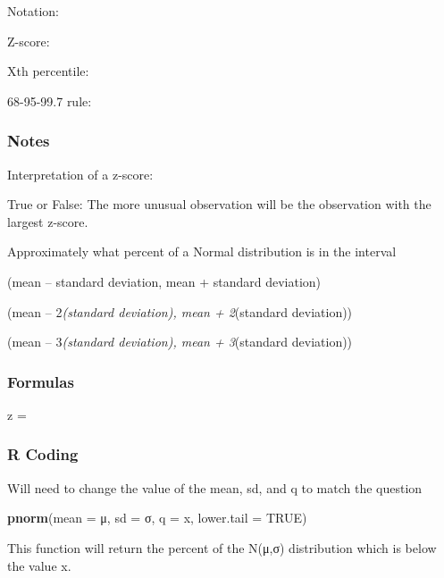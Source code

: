 \documentclass[
]{report}
\newenvironment{Shaded}{\begin{snugshade}}{\end{snugshade}}
\newcommand{\DataTypeTok}[1]{\textcolor[rgb]{0.13,0.29,0.53}{#1}}
\newcommand{\KeywordTok}[1]{\textcolor[rgb]{0.13,0.29,0.53}{\textbf{#1}}}
\newcommand{\NormalTok}[1]{#1}
\newcommand{\OtherTok}[1]{\textcolor[rgb]{0.56,0.35,0.01}{#1}}
\newcommand{\rgs}{\vspace{12pt}} %
\newcommand{\rgi}{\hspace{24pt}}  %
\begin{document}
\rgi Notation:
\rgs

Z-score:
\rgs

Xth percentile:
\rgs

68-95-99.7 rule:
\rgs

\hypertarget{notes-16}{%
\subsubsection*{Notes}\label{notes-16}}

Interpretation of a z-score:
\rgs

True or False: The more unusual observation will be the observation with the largest z-score.

Approximately what percent of a Normal distribution is in the interval

\rgi (mean -- standard deviation, mean + standard deviation)
\rgs

\rgi (mean -- 2\emph{(standard deviation), mean + 2}(standard deviation))
\rgs

\rgi (mean -- 3\emph{(standard deviation), mean + 3}(standard deviation))
\rgs

\hypertarget{formulas-1}{%
\subsubsection*{Formulas}\label{formulas-1}}

z =
\rgs

\hypertarget{r-coding}{%
\subsubsection*{R Coding}\label{r-coding}}

Will need to change the value of the mean, sd, and q to match the question

\begin{Shaded}
\begin{Highlighting}[]
\KeywordTok{pnorm}\NormalTok{(}\DataTypeTok{mean =}\NormalTok{ μ, }\DataTypeTok{sd =}\NormalTok{ σ, }\DataTypeTok{q =}\NormalTok{ x, }\DataTypeTok{lower.tail =} \OtherTok{TRUE}\NormalTok{)}
\end{Highlighting}
\end{Shaded}

This function will return the percent of the N(μ,σ) distribution which is below the value x.
\end{document}
